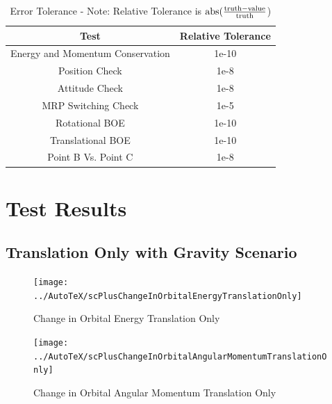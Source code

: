 \begin{table}[htbp]
	\caption{Error Tolerance - Note: Relative Tolerance is $\textnormal{abs}(\frac{\textnormal{truth} - \textnormal{value}}{\textnormal{truth}}$)}
	\label{tab:errortol}
	\centering \fontsize{10}{10}\selectfont
	\begin{tabular}{ c | c } %
		\hline
		\textbf{Test}   & \textbf{Relative Tolerance} \\
		\hline
		Energy and Momentum Conservation & 1e-10 \\
		Position Check & 1e-8 \\
		Attitude Check & 1e-8 \\
		MRP Switching Check & 1e-5 \\
		Rotational BOE & 1e-10 \\
		Translational BOE & 1e-10 \\
		Point B Vs. Point C & 1e-8 \\
		\hline	
	\end{tabular}
\end{table}

\clearpage

\section{Test Results}

\subsection{Translation Only with Gravity Scenario}
\begin{figure}[htbp]
	\centerline{
		\texttt{[image: ../AutoTeX/scPlusChangeInOrbitalEnergyTranslationOnly]}}
	\caption{Change in Orbital Energy Translation Only}
	\label{fig:ChangeInOrbitalEnergyTranslationOnly}
\end{figure}
\begin{figure}[htbp]
	\centerline{
		\texttt{[image: ../AutoTeX/scPlusChangeInOrbitalAngularMomentumTranslationOnly]}}
	\caption{Change in Orbital Angular Momentum Translation Only}
	\label{fig:ChangeInOrbitalAngularMomentumTranslationOnly}
\end{figure}
\clearpage

